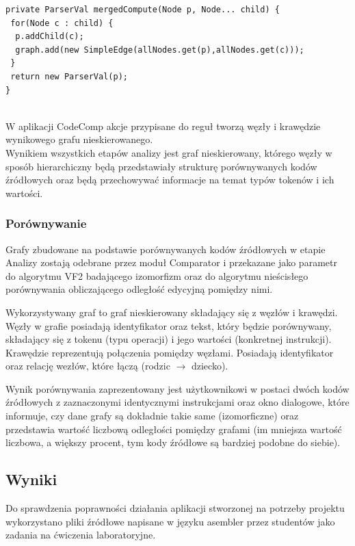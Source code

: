 \documentclass[a4paper,12pt]{article}
\begin{document}
\begin{lstlisting}[caption={Funkcja pomocnicza parsera.}, label={lst:help}]
private ParserVal mergedCompute(Node p, Node... child) {
 for(Node c : child) {
  p.addChild(c);
  graph.add(new SimpleEdge(allNodes.get(p),allNodes.get(c)));
 }
 return new ParserVal(p);
}
\end{lstlisting}
\\

W aplikacji CodeComp akcje przypisane do reguł tworzą węzły i krawędzie wynikowego grafu nieskierowanego.
\\

Wynikiem wszystkich etapów analizy jest graf nieskierowany, którego węzły w sposób hierarchiczny będą przedstawiały strukturę porównywanych kodów źródłowych oraz będą przechowywać informacje na temat typów tokenów i ich wartości.

\subsubsection{Porównywanie}

Grafy zbudowane na podstawie porównywanych kodów źródłowych w etapie Analizy zostają odebrane przez moduł Comparator i przekazane jako parametr do algorytmu VF2 badającego izomorfizm oraz do algorytmu nieścisłego porównywania obliczającego odległość edycyjną pomiędzy nimi.

Wykorzystywany graf to graf nieskierowany składający się z węzłów i krawędzi. Węzły w grafie posiadają identyfikator oraz tekst, który będzie porównywany, składający się z tokenu (typu operacji) i jego wartości (konkretnej instrukcji). Krawędzie reprezentują połączenia pomiędzy węzłami. Posiadają identyfikator oraz relację wezłów, które łączą (rodzic $\rightarrow$ dziecko).

Wynik porównywania zaprezentowany jest użytkownikowi w postaci dwóch kodów źródłowych z zaznaczonymi identycznymi instrukcjami oraz okno dialogowe, które informuje, czy dane grafy są dokładnie takie same (izomorficzne) oraz przedstawia wartość liczbową odległości pomiędzy grafami (im mniejsza wartość liczbowa, a większy procent, tym kody źródłowe są bardziej podobne do siebie).

\newpage

\subsection{Wyniki}

Do sprawdzenia poprawności działania aplikacji stworzonej na potrzeby projektu wykorzystano pliki źródłowe napisane w języku asembler przez studentów jako zadania na ćwiczenia laboratoryjne.
\end{document}
